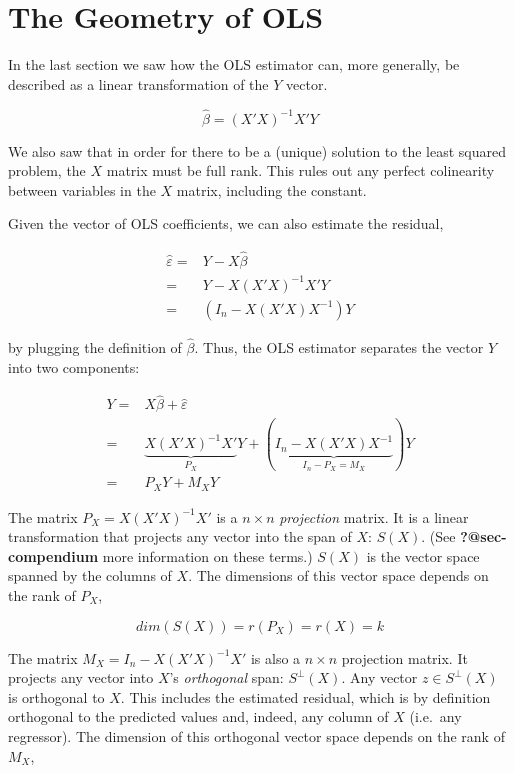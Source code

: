\documentclass[
  letterpaper,
  DIV=11,
  numbers=noendperiod]{scrreprt}
\author{}
\date{}
\begin{document}
\ifdefined\Shaded\renewenvironment{Shaded}{\begin{tcolorbox}[enhanced, interior hidden, sharp corners, breakable, borderline west={3pt}{0pt}{shadecolor}, boxrule=0pt, frame hidden]}{\end{tcolorbox}}\fi

\hypertarget{sec-geometry}{%
\chapter{The Geometry of OLS}\label{sec-geometry}}

In the last section we saw how the OLS estimator can, more generally, be
described as a linear transformation of the \(Y\) vector.

\[
\hat{\beta} = (X'X)^{-1}X'Y
\]

We also saw that in order for there to be a (unique) solution to the
least squared problem, the \(X\) matrix must be full rank. This rules
out any perfect colinearity between variables in the \(X\) matrix,
including the constant.

Given the vector of OLS coefficients, we can also estimate the residual,

\[
\begin{align}
\hat{\varepsilon} =& Y - X\hat{\beta} \\
=&Y-X(X'X)^{-1}X'Y \\
=&(I_n-X(X'X)X^{-1})Y
\end{align}
\]

by plugging the definition of \(\hat{\beta}\). Thus, the OLS estimator
separates the vector \(Y\) into two components:

\[
\begin{align}
 Y =& X\hat{\beta} + \hat{\varepsilon} \\
=&\underbrace{X(X'X)^{-1}X'}_{P_X}Y + (\underbrace{I_n-X(X'X)X^{-1}}_{I_n-P_X = M_X})Y \\
=&P_XY + M_XY
\end{align}
\]

The matrix \(P_X = X(X'X)^{-1}X'\) is a \(n\times n\) \emph{projection}
matrix. It is a linear transformation that projects any vector into the
span of \(X\): \(S(X)\). (See \textbf{?@sec-compendium} more information
on these terms.) \(S(X)\) is the vector space spanned by the columns of
\(X\). The dimensions of this vector space depends on the rank of
\(P_X\),

\[
dim(S(X)) = r(P_X) = r(X) = k
\]

The matrix \(M_X = I_n-X(X'X)^{-1}X'\) is also a \(n\times n\)
projection matrix. It projects any vector into \(X\)'s \emph{orthogonal}
span: \(S^{\perp}(X)\). Any vector \(z\in S^{\perp}(X)\) is orthogonal
to \(X\). This includes the estimated residual, which is by definition
orthogonal to the predicted values and, indeed, any column of \(X\)
(i.e.~any regressor). The dimension of this orthogonal vector space
depends on the rank of \(M_X\),
\end{document}
